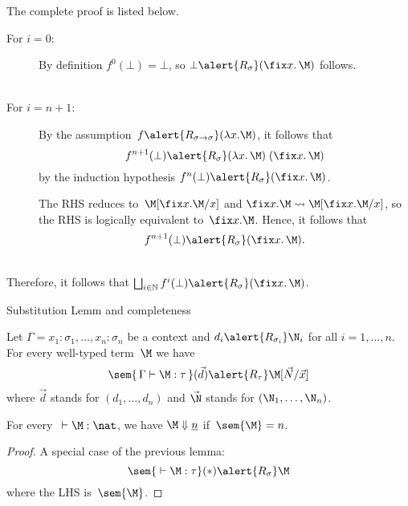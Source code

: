 \begin{frame}
  The complete proof is listed below.
  \begin{description}
    \item[For $i = 0$:] By definition $f^0(\bot) = \bot$, so
      $\bot \alert{\mathrel{R_\sigma}} (\fix x.\, \M)$ follows.
      \\~\\
    \item[For $i = n + 1$:]
      By the assumption~$f\alert{\mathrel{R_{\sigma\to\sigma}}}(\lambda x.\M)$, it
      follows that
      \[
        f^{n+1}(\bot)
        \alert{\mathrel{R_\sigma}} (\lambda x.\,\M)\; (\fix x.\,\M)
      \]
      by the induction hypothesis
      $f^n(\bot) \alert{\mathrel{R_\sigma}} (\fix x.\, \M)$. 

      The RHS reduces to~$\M[\fix x.\M /x]$ and $\fix x.\M \leadsto
      \M[\fix x.\M / x]$, so the RHS is logically equivalent to~$\fix x.\M$.
      Hence, it follows that
      \[
        f^{n+1}(\bot) \alert{\mathrel{R_\sigma}} (\fix x.\,\M).
      \]
  \end{description}
  ~\\
  Therefore, it follows that $\bigsqcup_{i \in \mathbb{N}} f^{i}(\bot)
  \alert{\mathrel{R_\sigma}} (\fix x.\, \M)$. 
\end{frame}
\begin{frame}{Substitution Lemm and completeness}
  \begin{lemma}[Substitution]
    Let $\Gamma = x_1:\sigma_1, \dots, x_n:\sigma_n$ be a context and $d_i
    \alert{\mathrel{R_{\sigma_i}}} \N_i$ for all $i = 1, \dots, n$.
    For every well-typed term~$\M$ we have
    \[
      \sem{\, \Gamma \vdash \M : \tau\,}(\vec{d})
      \alert{\mathrel{R_\tau}}
      \M[\vec{N}/\vec{x}]
    \]
    where $\vec{d}$ stands for $(d_1, \dots, d_n)$ 
    and $\vec{\N}$ stands for $(\N_1, \dots, \N_n)$.
  \end{lemma}
  \begin{theorem}[Completeness]
    For every~${}\vdash \M:\nat$, we have $\M \Downarrow \underline{n}$
    if~$\sem{\M} = n$. 
  \end{theorem}
  \begin{proof}
    A special case of the previous lemma:
    \[
      \sem{{}\vdash \M:\tau}(*) \alert{\mathrel{R_\sigma}} \M
    \]
    where the LHS is~$\sem{\M}$.
  \end{proof}
\end{frame}

